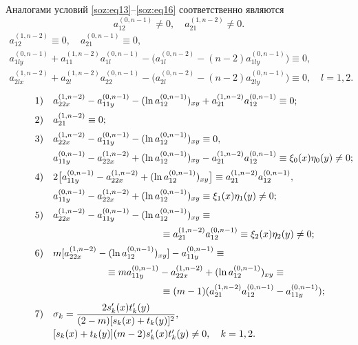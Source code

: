 Аналогами условий \eqref{soz:eq13}--\eqref{soz:eq16} соответственно являются
\begin{equation}
a_{12}^{(0,n-1)}\neq0,\quad  a_{21}^{(1,n-2)}\neq0.
\label{soz:eq19}
\end{equation}
\begin{equation}
\begin{array}{l}
a_{12}^{(1,n-2)}\equiv0,\quad  a_{21}^{(0,n-1)}\equiv0,
\\[2mm]
a_{1ly}^{(0,n-1)}+a_{11}^{(1,n-2)}a_{1l}^{(0,n-1)}- \bigl(a_{1l}^{(0,n-2)}-(n-2)a_{1ly}^{(0,n-1)}\bigr)\equiv0,
\\[2mm]
a_{2lx}^{(1,n-2)}+a_{2l}^{(1,n-2)}a_{22}^{(0,n-1)}- \bigl(a_{2l}^{(0,n-2)}-(n-2)a_{2ly}^{(0,n-1)}\bigr)\equiv0,\quad  l=1, 2.
\end{array}
\label{soz:eq20}
\end{equation}
\begin{equation}
\begin{array}{ll}
1) & a_{22x}^{(1,n-2)}-a_{11y}^{(0,n-1)}-(\ln a_{12}^{(0,n-1)})_{xy}+a_{21}^{(1,n-2)}a_{12}^{(0,n-1)}\equiv0; 
\\[2mm]
2) &  a_{21}^{(1,n-2)}\equiv0; 
\\[2mm]
3) & a_{22x}^{(1,n-2)}-a_{11y}^{(0,n-1)}-(\ln a_{12}^{(0,n-1)})_{xy}\equiv0,
\\[2mm]
   & a_{11y}^{(0,n-1)}-a_{22x}^{(1,n-2)}+(\ln a_{12}^{(0,n-1)})_{xy}-a_{21}^{(1,n-2)}a_{12}^{(0,n-1)}\equiv \xi_{0}(x)\eta_{0}(y)\neq0;
\\[2mm]   
4) & 2 \bigl[a_{11y}^{(0,n-1)}-a_{22x}^{(1,n-2)}+(\ln a_{12}^{(0,n-1)})_{xy}\bigr]\equiv a_{21}^{(1,n-2)}a_{12}^{(0,n-1)},
\\[2mm]
   & a_{11y}^{(0,n-1)}-a_{22x}^{(1,n-2)}+(\ln a_{12}^{(0,n-1)})_{xy}\equiv\xi_{1}(x)\eta_{1}(y)\neq0;
\\[2mm]
5) & a_{22x}^{(1,n-2)}-a_{11y}^{(0,n-1)}-(\ln a_{12}^{(0,n-1)})_{xy}\equiv 
\\[2mm]
   & \hspace{4cm} \equiv a_{21}^{(1,n-2)}a_{12}^{(0,n-1)}\equiv\xi_{2}(x)\eta_{2}(y)\neq0;
\\[2mm]
6) & m[a_{22x}^{(1,n-2)}-(\ln a_{12}^{(0,n-1)})_{xy}]-a_{11y}^{(0,n-1)}\equiv
\\[2mm]
   & \hspace{2cm} \equiv ma_{11y}^{(0,n-1)}-a_{22x}^{(1,n-2)}+(\ln a_{12}^{(0,n-1)})_{xy}\equiv
\\[2mm]
   & \hspace{4cm} \equiv(m-1)(a_{21}^{(1,n-2)}a_{12}^{(0,n-1)}-a_{11y}^{(0,n-1)});
\\[2mm]
7) & \sigma_{k}=\dfrac{2s' _{k}(x)t' _{k}(y)}{(2-m)[s_{k}(x)+t_{k}(y)]^{2}},
\\[3mm]
  & [s_{k}(x)+t_{k}(y)](m-2)s' _{k}(x)t' _{k}(y)\neq0, \quad  k=1, 2.
\end{array} 
\hspace{-1.1cm}
\label{soz:eq21}
\end{equation}

